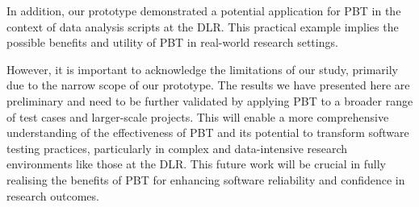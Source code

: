 \documentclass[runningheads]{llncs}
\begin{document}
In addition, our prototype demonstrated a potential application for PBT in the context of data analysis scripts at the DLR. This practical example implies the possible benefits and utility of PBT in real-world research settings.

However, it is important to acknowledge the limitations of our study, primarily due to the narrow scope of our prototype. The results we have presented here are preliminary and need to be further validated by applying PBT to a broader range of test cases and larger-scale projects. This will enable a more comprehensive understanding of the effectiveness of PBT and its potential to transform software testing practices, particularly in complex and data-intensive research environments like those at the DLR. This future work will be crucial in fully realising the benefits of PBT for enhancing software reliability and confidence in research outcomes.

%
%
%
\newpage


\end{document}
